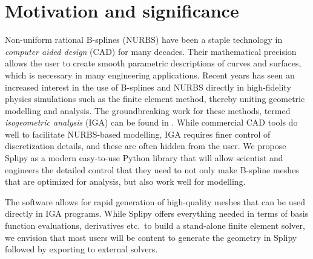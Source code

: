 \documentclass[preprint,12pt, a4paper]{elsarticle}
\begin{document}
\linenumbers


\section{Motivation and significance}
\label{sec:motivation}

Non-uniform rational B-splines (NURBS) have been a staple technology in \emph{computer aided design} (CAD) for many decades.
Their mathematical precision allows the user to create smooth parametric descriptions of curves and surfaces, which is necessary in many engineering applications.
Recent years has seen an increased interest in the use of B-splines and NURBS directly in high-fidelity physics simulations such as the finite element method, thereby uniting geometric modelling and analysis.
The groundbreaking work for these methods, termed \emph{isogeometric analysis} (IGA) can be found in \cite{hughes2005iac}.
While commercial CAD tools do well to facilitate NURBS-based modelling, IGA requires finer control of discretization details, and these are often hidden from the user.
We propose Splipy as a modern easy-to-use Python library that will allow scientist and engineers the detailed control that they need to not only make B-spline meshes that are optimized for analysis, but also work well for modelling.

The software allows for rapid generation of high-quality meshes that can be used directly in IGA programs.
While Splipy offers everything needed in terms of basis function evaluations, derivatives etc.~to build a stand-alone finite element solver, we envision that most users will be content to generate the geometry in Splipy followed by exporting to external solvers.

\end{document}
